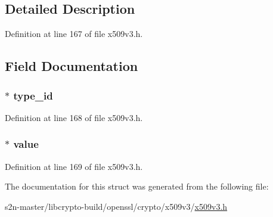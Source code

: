 \subsection{Detailed Description}


Definition at line 167 of file x509v3.\+h.



\subsection{Field Documentation}
\subsubsection[{\texorpdfstring{type\+\_\+id}{type_id}}]{ $\ast$ type\+\_\+id}\hypertarget{structother_name__st_aa253ee6dcb746893797af3b0b7c3a084}{}\label{structother_name__st_aa253ee6dcb746893797af3b0b7c3a084}


Definition at line 168 of file x509v3.\+h.

\subsubsection[{\texorpdfstring{value}{value}}]{ $\ast$ value}\hypertarget{structother_name__st_ae12bae97bbd17ff056fbd409f3dc3a42}{}\label{structother_name__st_ae12bae97bbd17ff056fbd409f3dc3a42}


Definition at line 169 of file x509v3.\+h.



The documentation for this struct was generated from the following file\+:\begin{DoxyCompactItemize}
\item 
s2n-\/master/libcrypto-\/build/openssl/crypto/x509v3/\hyperlink{crypto_2x509v3_2x509v3_8h}{x509v3.\+h}\end{DoxyCompactItemize}
